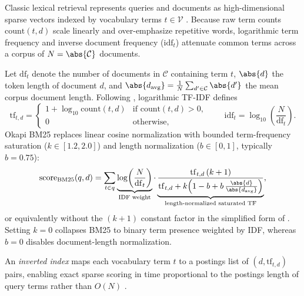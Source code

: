 \documentclass[../../../../master.tex]{subfiles}
\begin{document}
Classic lexical retrieval represents queries and documents as high-dimensional sparse vectors indexed by vocabulary terms $t \in \mathcal{V}$ . Because raw term counts $\mathrm{count}(t, d)$ scale linearly and over-emphasize repetitive words, logarithmic term frequency and inverse document frequency ($\mathrm{idf}_t$) attenuate common terms across a corpus of $N = \abs{\mathcal{C}}$ documents.

\begin{coremath}
Let $\mathrm{df}_t$ denote the number of documents in $\mathcal{C}$ containing term $t$, $\abs{d}$ the token length of document $d$, and $\abs{d_{\mathrm{avg}}} = \frac{1}{N}\sum_{d' \in \mathcal{C}} \abs{d'}$ the mean corpus document length. Following , logarithmic TF-IDF defines
\begin{equation}
  \mathrm{tf}_{t,d} = \begin{cases} 1 + \log_{10} \mathrm{count}(t,d) & \text{if } \mathrm{count}(t,d) > 0, \\ 0 & \text{otherwise,} \end{cases}
  \qquad \mathrm{idf}_t = \log_{10}\!\left(\frac{N}{\mathrm{df}_t}\right).
  \label{eq:rag:tfidf}
\end{equation}
Okapi BM25 replaces linear cosine normalization with bounded term-frequency saturation ($k \in [1.2, 2.0]$) and length normalization ($b \in [0, 1]$, typically $b = 0.75$):
\begin{equation}
  \mathrm{score}_{\mathrm{BM25}}(q, d) = \sum_{t \in q} \underbrace{\log\!\left(\frac{N}{\mathrm{df}_t}\right)}_{\text{IDF weight}} \cdot \underbrace{\frac{\mathrm{tf}_{t,d}\,(k + 1)}{\mathrm{tf}_{t,d} + k\!\left(1 - b + b\,\frac{\abs{d}}{\abs{d_{\mathrm{avg}}}}\right)}}_{\text{length-normalized saturated TF}},
  \label{eq:rag:bm25}
\end{equation}
or equivalently without the $(k+1)$ constant factor in the simplified form of . Setting $k = 0$ collapses BM25 to binary term presence weighted by IDF, whereas $b = 0$ disables document-length normalization.
\end{coremath}

An \emph{inverted index} maps each vocabulary term $t$ to a postings list of $(d, \mathrm{tf}_{t,d})$ pairs, enabling exact sparse scoring in time proportional to the postings length of query terms rather than $O(N)$ .
\end{document}
